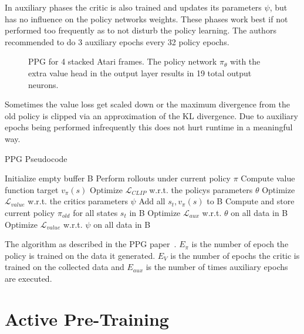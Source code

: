 \documentclass{article}
\begin{document}
\noindent In auxiliary phases the critic is also trained and updates its parameters $\psi$, but has no influence on the policy networks weights.
These phases work best if not performed too frequently as to not disturb
the policy learning. The authors recommended to do 3 auxiliary epochs every 32 policy epochs.

\begin{figure}[h]
  \centering
  
  \caption{PPG for 4 stacked Atari frames. The policy network $\pi_\theta$ with the extra value head in the output layer results in 19 total output neurons.}
\end{figure}

\noindent Sometimes the value loss get scaled down or the maximum divergence from
the old policy is clipped via an approximation of the KL divergence. Due to auxiliary epochs being performed
infrequently this does not hurt runtime in a meaningful way.\\

\begin{algorithm}[H]
\begin{algorithmic}[1]
\caption{PPG Pseudocode}
    \State Initialize empty buffer B
        \State Perform rollouts under current policy $\pi$
        \State Compute value function target $v_\pi(s)$
            \State Optimize $\mathcal{L}_{CLIP}$ w.r.t. the policys parameters $\theta$
        \EndFor
            \State Optimize $\mathcal{L}_{value}$ w.r.t. the critics parameters $\psi$
        \EndFor
        \State Add all $s_t, v_\pi(s)$ to B
        \State Compute and store current policy $\pi_{old}$ for all states $s_t$ in B
            \State Optimize $\mathcal{L}_{aux}$ w.r.t. $\theta$ on all data in B
            \State Optimize $\mathcal{L}_{value}$ w.r.t. $\psi$ on all data in B
        \EndFor
    \EndFor
\EndFor
\end{algorithmic}
\end{algorithm}

\noindent The algorithm as described in the PPG paper~\cite{DBLP:journals/corr/abs-2009-04416}. $E_\pi$ is the number of 
epoch the policy is trained on the data it generated. $E_V$ is the number of epochs the critic is 
trained on the collected data and $E_{aux}$ is the number of times auxiliary epochs are executed.

\section{Active Pre-Training}
\end{document}
